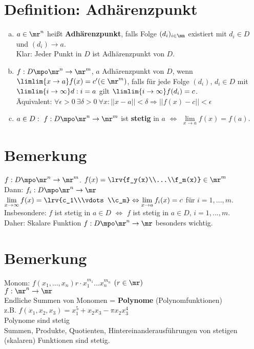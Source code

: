 \section{Definition: Adhärenzpunkt}
	\begin{enumerate}[a)]
		\item $ a\in\mr^n $ heißt \textbf{Adhärenzpunkt}, falls Folge $ (d_i)_{i\in\mn} $ existiert mit $ d_i\in D $ und $ (d_i)\rightarrow a $.\\
		Klar: Jeder Punkt in $ D $ ist Adhärenzpunkt von $ D $.
		
		\item $ f:D\mpo\mr^n\rightarrow\mr^m $, $ a $ Adhärenzpunkt von $ D $, wenn $ \limlim{x\rightarrow a}f(x)=c'(\in\mr^m) $, falls für jede Folge $ (d_i) $, $ d_i\in D $ mit $ \limlim{i\rightarrow\infty}d:i=a $ gilt $ \limlim{i\rightarrow\infty}f(d_i)=c $.\\
		Äquivalent: $ \forall\epsilon >0\ \exists\delta>0\ \forall x:||x-a||<\delta\Rightarrow||f(x)-c||<\epsilon $
		
		\item $ a\in D:\ f:D\mpo\mr^n\rightarrow\mr^m $ ist \textbf{stetig} in $ a $ $ \Leftrightarrow $ $ \lim\limits_{x\rightarrow a}f(x)=f(a) $.
	\end{enumerate}

\section{Bemerkung}
	$ f:D\mpo\mr^n\rightarrow\mr^m $. $ f(x)=\lrv{f_y(x)\\...\\f_m(x)}\in\mr^m$\\
	Dann: $ f_i:D\mpo\mr^n\rightarrow\mr $\\
	$ \lim\limits_{x\rightarrow\infty}f(x)=\lrv{c_1\\\vdots\\c_m}\Leftrightarrow\lim\limits_{x\rightarrow a}f_i(x)=c $ für $ i=1,...,m $.\\
	Insbesondere: $ f $ ist stetig in $ a\in D $ $ \Leftrightarrow $ $ f $ ist stetig in $ a\in D $, $ i=1,...,m $.\\
	Daher: Skalare Funktion $ f:D\mpo\mr^n\rightarrow\mr $ besonders wichtig.
	
\section{Bemerkung}
	Monom: $ f(x_1,...,x_n)r\cdot x_1^{m_1}...x_n^{m_n} $ $ (r\in\mr) $\\
	$ f:\mr^n\rightarrow\mr $\\
	Endliche Summen von Monomen = \textbf{Polynome} (Polynomfunktionen)\\
	z.B. $ f(x_1,x_2,x_3)=x_1^5+x_2x_3-\pi x_2x_3^4 $\\
	Polynome sind stetig\\
	Summen, Produkte, Quotienten, Hintereinanderausführungen von stetigen (skalaren) Funktionen sind stetig.
	
